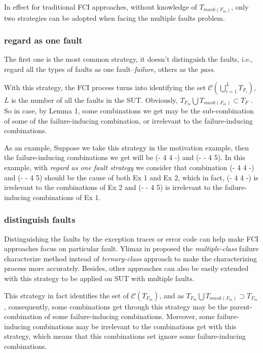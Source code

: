 \documentclass{sig-alternate}
\begin{document}
In effect for traditional FCI approaches, without knowledge of  $T_{mask(F_{m})}$,  only two strategies can be adopted when facing the multiple faults problem.

\subsubsection{regard as one fault}
The first one is the most common strategy, it doesn't distinguish the faults, i.e., regard all the types of faults as one fault--\emph{failure}, others as the \emph{pass}.

With this strategy, the FCI process turns into identifying the set $\mathcal{C}(\bigcup_{i = 1}^{L}T_{F_{i}})$, $L$ is the number of all the faults in the SUT. Obviously, $T_{F_{m}} \bigcup T_{mask(F_{m})} \subset T_{F}$ . So in case, by Lemma 1, some combinations we get may be the sub-combination of some of the failure-inducing combination, or irrelevant to the failure-inducing combinations.

As an example, Suppose we take this strategy in the motivation example, then the failure-inducing combinations we get will be (- 4 4 -) and (- - 4 5). In this example, with \emph{regard as one fault strategy} we consider that combination (- 4 4 -) and (- - 4 5) should be the cause of both Ex 1 and Ex 2, which in fact, (- 4 4 -) is irrelevant to the combinations of Ex 2 and (- - 4 5) is irrelevant to the failure-inducing combinations of Ex 1.

\subsubsection{distinguish faults}
Distinguishing the faults by the exception traces or error code can help make FCI approaches focus on particular fault. Ylimaz in  \cite{yilmaz2013reducing} proposed the \emph{multiple-class} failure characterize method instead of \emph{ternary-class} approach to make the characterizing process more accurately. Besides, other approaches can also be easily extended with this strategy to be applied on SUT with multiple faults. 

This strategy in fact identifies the set of $\mathcal{C}(T_{F_{m}})$, and as $T_{F_{m}} \bigcup T_{mask(F_{m})} \supset T_{F_{m}} $, consequently, some combinations get through this strategy may be the parent-combination of some failure-inducing combinations. Moreover, some failure-inducing combinations may be irrelevant to the combinations get with this strategy, which means that this combinations set ignore some failure-inducing combinations.
\end{document}
